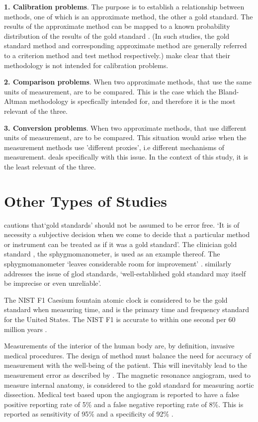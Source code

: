 \documentclass[12pt, a4paper]{report}
\theoremstyle{plain}
\theoremstyle{definition}
\theoremstyle{remark}
\begin{document}
\textbf{1. Calibration problems}. The purpose is to establish a
relationship between methods, one of which is an approximate
method, the other a gold standard. The results of the approximate
method can be mapped to a known probability distribution of the
results of the gold standard \citep{lewis}. (In such studies, the
gold standard method and corresponding approximate method are
generally referred to a criterion method and test method
respectively.) \citet*{BA83} make clear that their methodology is
not intended for calibration problems.

\bigskip \textbf{2. Comparison problems}. When two approximate
methods, that use the same units of measurement, are to be
compared. This is the case which the Bland-Altman methodology is
specfically intended for, and therefore it is the most relevant of
the three.

\bigskip \textbf{3. Conversion problems}. When two approximate
methods, that use different units of measurement, are to be
compared. This situation would arise when the measurement methods
use 'different proxies', i.e different mechanisms of measurement.
\citet{lewis} deals specifically with this issue. In the context
of this study, it is the least relevant of the three.

\section{Other Types of Studies}

\citet[p.47]{DunnSEME} cautions that`gold standards' should not be
assumed to be error free. `It is of necessity a subjective
decision when we come to decide that a particular method or
instrument can be treated as if it was a gold standard'. The
clinician gold standard , the sphygmomanometer, is used as an
example thereof.  The sphygmomanometer `leaves considerable room
for improvement' \citep{DunnSEME}. \citet{pizzi} similarly
addresses the issue of glod standards, `well-established gold
standard may itself be imprecise or even unreliable'.


The NIST F1 Caesium fountain atomic clock is considered to be the
gold standard when measuring time, and is the primary time and
frequency standard for the United States. The NIST F1 is accurate
to within one second per 60 million years \citep{NIST}.

Measurements of the interior of the human body are, by definition,
invasive medical procedures. The design of method must balance the
need for accuracy of measurement with the well-being of the
patient. This will inevitably lead to the measurement error as
described by \citet{DunnSEME}. The magnetic resonance angiogram,
used to measure internal anatomy,  is considered to the gold
standard for measuring aortic dissection. Medical test based upon
the angiogram is reported to have a false positive reporting rate
of 5\% and a false negative reporting rate of 8\%. This is
reported as sensitivity of 95\% and a specificity of 92\%
\citep{ACR}.
\end{document}
